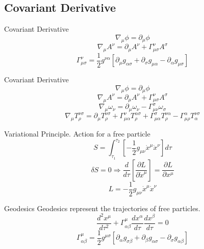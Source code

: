\documentclass{beamer}
\begin{document}
\begin{darkframes}
    \subsection{Covariant Derivative}
   		\begin{frame}{Covariant Derivative} 
        	$$ \nabla_{\mu} \phi = \partial_{\mu} \phi $$
            \pause
        	$$ \nabla_{\mu} A^{\nu} = \partial_{\mu} A^{\nu} + \Gamma^{\nu}_{\mu \sigma} A^{\sigma} $$
            \pause
            $$ \Gamma^{\nu}_{\mu \sigma} = \frac{1}{2} g^{\nu \alpha} \left[ \partial_{\mu} g_{\alpha \sigma} + \partial_{\sigma} g_{\mu \alpha} - \partial_{\alpha} g_{\mu \sigma} \right] $$           
   		\end{frame}
        
        \begin{frame}{Covariant Derivative}   		
        	$$ \nabla_{\mu} \phi = \partial_{\mu} \phi $$
            $$ \nabla_{\mu} A^{\nu} = \partial_{\mu} A^{\nu} + \Gamma^{\nu}_{\mu \sigma} A^{\sigma} $$
            \pause
            $$ \nabla_{\mu} \omega_{\nu} = \partial_{\mu} \omega_{\nu} - \Gamma^{\sigma}_{\mu \nu} \omega_{\sigma} $$
            \pause
            $$ \nabla_{\mu} T^{\nu \sigma}_{\rho} = \partial_{\mu} T^{\nu \sigma}_{\rho} + \Gamma^{\nu}_{\mu \alpha} T^{\alpha \sigma}_{\rho} + \Gamma^{\sigma}_{\mu \alpha} T^{\nu \alpha}_{\rho} - \Gamma^{\alpha}_{\mu \rho} T^{\nu \sigma}_{\alpha} $$
   		\end{frame} 
        
        \begin{frame}{Variational Principle. Action for a free particle}
        	$$ S = \int_{\tau_1} ^{\tau_2} \left[ -\frac{1}{2} g_{\mu\nu} \dot{x}^\mu \dot{x}^\nu  \right] d\tau $$
            \pause
        	$$ \delta S = 0  \Longrightarrow  \frac{d}{d\tau} \left[ \frac{\partial L}{\partial \dot{x}^\mu} \right] = \frac{\partial L}{\partial x^\mu}$$
            \pause
    		$$ L = -\frac{1}{2} g_{\mu\nu} \dot{x}^\mu \dot{x}^\nu  $$ 
    	\end{frame}
        
        \begin{frame}{Geodesics}
    	Geodesics represent the trajectories of free particles.
        $$ \frac{d^2 x^\mu}{d \tau^2} + \Gamma^\mu_{\alpha \beta} \frac{dx^\alpha}{d\tau} \frac{dx^\beta}{d\tau} = 0 $$
        \pause
         $$ \Gamma^{\mu}_{\alpha \beta} = \frac{1}{2} g^{\mu \sigma} \left[ \partial_{\alpha} g_{\sigma \beta} + \partial_{\beta} g_{\alpha \sigma} - \partial_{\sigma} g_{\alpha \beta} \right] $$   
    	\end{frame}  
   

\end{darkframes}
\end{document}
